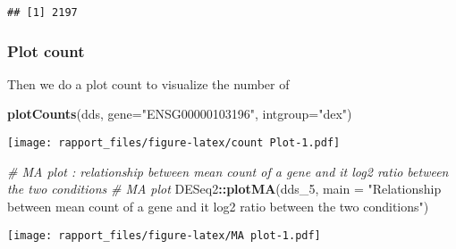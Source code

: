 \documentclass[]{article}
\newenvironment{Shaded}{\begin{snugshade}}{\end{snugshade}}
\newcommand{\KeywordTok}[1]{\textcolor[rgb]{0.13,0.29,0.53}{\textbf{#1}}}
\newcommand{\DataTypeTok}[1]{\textcolor[rgb]{0.13,0.29,0.53}{#1}}
\newcommand{\DecValTok}[1]{\textcolor[rgb]{0.00,0.00,0.81}{#1}}
\newcommand{\FloatTok}[1]{\textcolor[rgb]{0.00,0.00,0.81}{#1}}
\newcommand{\StringTok}[1]{\textcolor[rgb]{0.31,0.60,0.02}{#1}}
\newcommand{\CommentTok}[1]{\textcolor[rgb]{0.56,0.35,0.01}{\textit{#1}}}
\newcommand{\OperatorTok}[1]{\textcolor[rgb]{0.81,0.36,0.00}{\textbf{#1}}}
\newcommand{\NormalTok}[1]{#1}
\begin{document}
\begin{Shaded}
\end{Shaded}

\begin{verbatim}
## [1] 2197
\end{verbatim}

\subsubsection{Plot count}\label{plot-count}

Then we do a plot count to visualize the number of

\begin{Shaded}
\begin{Highlighting}[]
\KeywordTok{plotCounts}\NormalTok{(dds, }\DataTypeTok{gene=}\StringTok{"ENSG00000103196"}\NormalTok{, }\DataTypeTok{intgroup=}\StringTok{"dex"}\NormalTok{)}
\end{Highlighting}
\end{Shaded}

\texttt{[image: rapport\_files/figure-latex/count Plot-1.pdf]}

\begin{Shaded}
\begin{Highlighting}[]
\CommentTok{# MA plot : relationship between mean count of a gene and it log2 ratio between the two conditions}
\CommentTok{# MA plot }
\NormalTok{DESeq2}\OperatorTok{::}\KeywordTok{plotMA}\NormalTok{(dds_}\DecValTok{5}\NormalTok{, }\DataTypeTok{main =} \StringTok{"Relationship between mean count of a gene and it log2 ratio between the two conditions"}\NormalTok{)}
\end{Highlighting}
\end{Shaded}

\texttt{[image: rapport\_files/figure-latex/MA plot-1.pdf]}
\end{document}
